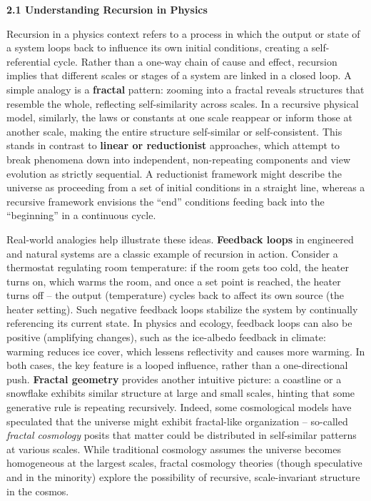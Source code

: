 \documentclass[
]{article}
\begin{document}
\textbf{2.1 Understanding Recursion in Physics}

Recursion in a physics context refers to a process in which the output
or state of a system loops back to influence its own initial conditions,
creating a self-referential cycle. Rather than a one-way chain of cause
and effect, recursion implies that different scales or stages of a
system are linked in a closed loop. A simple analogy is a
\textbf{fractal} pattern: zooming into a fractal reveals structures that
resemble the whole, reflecting self-similarity across
scales\hspace{0pt}. In a recursive physical model, similarly, the laws
or constants at one scale reappear or inform those at another scale,
making the entire structure self-similar or self-consistent. This stands
in contrast to \textbf{linear or reductionist} approaches, which attempt
to break phenomena down into independent, non-repeating components and
view evolution as strictly sequential. A reductionist framework might
describe the universe as proceeding from a set of initial conditions in
a straight line, whereas a recursive framework envisions the ``end''
conditions feeding back into the ``beginning'' in a continuous cycle.

Real-world analogies help illustrate these ideas. \textbf{Feedback
loops} in engineered and natural systems are a classic example of
recursion in action. Consider a thermostat regulating room temperature:
if the room gets too cold, the heater turns on, which warms the room,
and once a set point is reached, the heater turns off -- the output
(temperature) cycles back to affect its own source (the heater setting).
Such negative feedback loops stabilize the system by continually
referencing its current state. In physics and ecology, feedback loops
can also be positive (amplifying changes), such as the ice-albedo
feedback in climate: warming reduces ice cover, which lessens
reflectivity and causes more warming. In both cases, the key feature is
a looped influence, rather than a one-directional push. \textbf{Fractal
geometry} provides another intuitive picture: a coastline or a snowflake
exhibits similar structure at large and small scales, hinting that some
generative rule is repeating recursively. Indeed, some cosmological
models have speculated that the universe might exhibit fractal-like
organization -- so-called \emph{fractal cosmology} posits that matter
could be distributed in self-similar patterns at various
scales\hspace{0pt}. While traditional cosmology assumes the universe
becomes homogeneous at the largest scales, fractal cosmology theories
(though speculative and in the minority) explore the possibility of
recursive, scale-invariant structure in the cosmos\hspace{0pt}.
\end{document}
